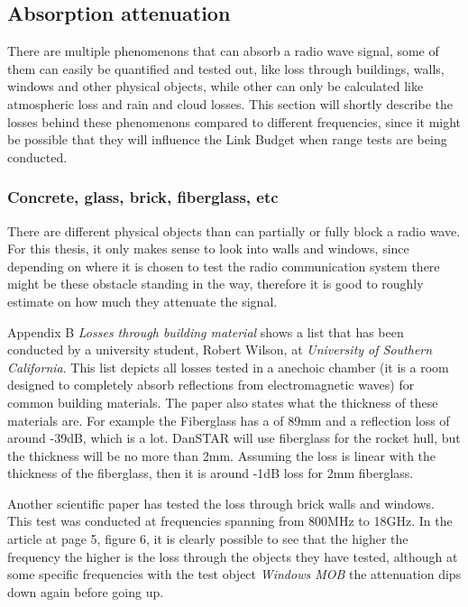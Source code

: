 \subsection{Absorption attenuation}
There are multiple phenomenons that can absorb a radio wave signal, some of them can easily be quantified and tested out, like loss through buildings, walls, windows and other physical objects, while other can only be calculated like atmospheric loss and rain and cloud losses. This section will shortly describe the losses behind these phenomenons compared to different frequencies, since it might be possible that they will influence the Link Budget when range tests are being conducted. 

\subsubsection{Concrete, glass, brick, fiberglass, etc}
There are different physical objects than can partially or fully block a radio wave. For this thesis, it only makes sense to look into walls and windows, since depending on where it is chosen to test the radio communication system there might be these obstacle standing in the way, therefore it is good to roughly estimate on how much they attenuate the signal. 

Appendix B \textit{Losses through building material} shows a list that has been conducted by a university student, Robert Wilson, at \textit{University of Southern California}. This list depicts all losses tested in a anechoic chamber (it is a room designed to completely absorb reflections from electromagnetic waves) for common building materials. The paper \cite{Magis} also states what the thickness of these materials are. For example the Fiberglass has a of 89mm and a reflection loss of around -39dB, which is a lot. DanSTAR will use fiberglass for the rocket hull, but the thickness will be no more than 2mm. Assuming the loss is linear with the thickness of the fiberglass, then it is around -1dB loss for 2mm fiberglass.

Another scientific paper has tested the loss through brick walls and windows\cite{ModernBuildings}. This test was conducted at frequencies spanning from 800MHz to 18GHz. In the article at page 5, figure 6, it is clearly possible to see that the higher the frequency the higher is the loss through the objects they have tested, although at some specific frequencies with the test object \textit{Windows MOB} the attenuation dips down again before going up. 

